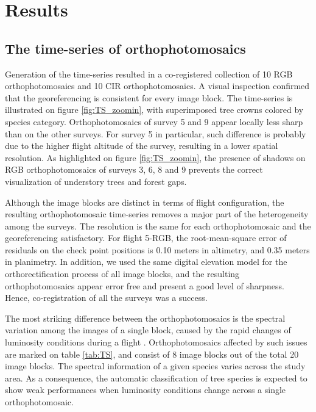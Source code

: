 \documentclass[remotesensing,article,submit,moreauthors,pdftex,12pt,a4paper]{mdpi} %
\begin{document}
\section{Results}

\subsection{The time-series of orthophotomosaics}

Generation of the time-series resulted in a co-registered collection of 10 RGB orthophotomosaics and 10 CIR orthophotomosaics. 
A visual inspection confirmed that the georeferencing is consistent for every image block. 
The time-series is illustrated on figure \ref{fig:TS_zoomin}, with superimposed tree crowns colored by species category. 
Orthophotomosaics of survey 5 and 9 appear locally less sharp than on the other surveys. 
For survey 5 in particular, such difference is probably due to the higher flight altitude of the survey, resulting in a lower spatial resolution.
As highlighted on figure \ref{fig:TS_zoomin}, the presence of shadows on RGB orthophotomosaics of surveys 3, 6, 8 and 9 prevents the correct visualization of understory trees and forest gaps.

Although the image blocks are distinct in terms of flight configuration, the resulting orthophotomosaic time-series removes a major part of the heterogeneity among the surveys. 
The resolution is the same for each orthophotomosaic and the georeferencing satisfactory. 
For flight 5-RGB, the root-mean-square error of residuals on the check point positions is 0.10 meters in altimetry, and 0.35 meters in planimetry. %
In addition, we used the same digital elevation model for the orthorectification process of all image blocks, and the resulting orthophotomosaics appear error free and present a good level of sharpness.  
Hence, co-registration of all the surveys was a success. 

The most striking difference between the orthophotomosaics is the spectral variation among the images of a single block, caused by the rapid changes of luminosity conditions during a flight \cite{honkavaara_digital_2009}. 
Orthophotomosaics affected by such issues are marked on table \ref{tab:TS}, and consist of 8 image blocks out of the total 20 image blocks. 
The spectral information of a given species varies across the study area. As a consequence, the automatic classification of tree species is expected to show weak performances when luminosity conditions change across a single orthophotomosaic.
\end{document}
